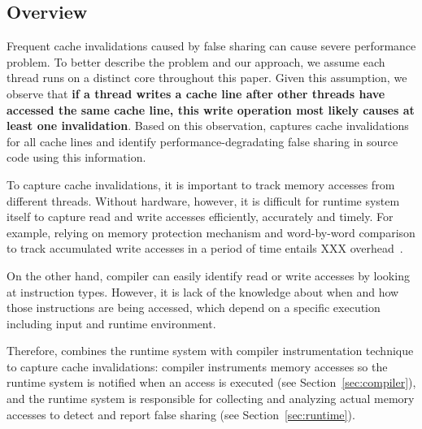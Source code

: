 \label{sec:detection}

\subsection{Overview}
\label{sec:overview}
Frequent cache invalidations caused by false sharing can cause severe performance problem.
To better describe the problem and our approach, we assume each thread runs on a distinct core throughout this
paper. Given this assumption, we observe that 
\textbf{if a thread writes a cache line after other threads have 
accessed the same cache line, this write operation most likely causes at least
one invalidation}. 
Based on this observation, \Defaults{} captures cache invalidations for all cache lines and 
identify performance-degradating false sharing in source code using this information.
 
To capture cache invalidations, it is important to track memory accesses from different 
threads. 
Without hardware, however, it is difficult for runtime system itself to capture read and write accesses efficiently, 
accurately and timely. 
For example, \Sheriff{} relying on memory protection mechanism and word-by-word
comparison to track accumulated write accesses in a period of time 
entails XXX overhead~\cite{sheriff}. 


On the other hand, compiler can easily identify  
read or write accesses by looking at instruction types. However,
it is lack of the knowledge about when and how those instructions are being accessed, 
which depend on a specific execution including input and runtime environment. 

Therefore,  combines the runtime system with compiler instrumentation technique to capture 
cache invalidations: compiler instruments memory accesses so the runtime
system is notified when an access is executed (see Section~\ref{sec:compiler}),
and the runtime system is responsible for collecting and analyzing actual memory accesses 
to detect and report false sharing (see Section~\ref{sec:runtime}).

